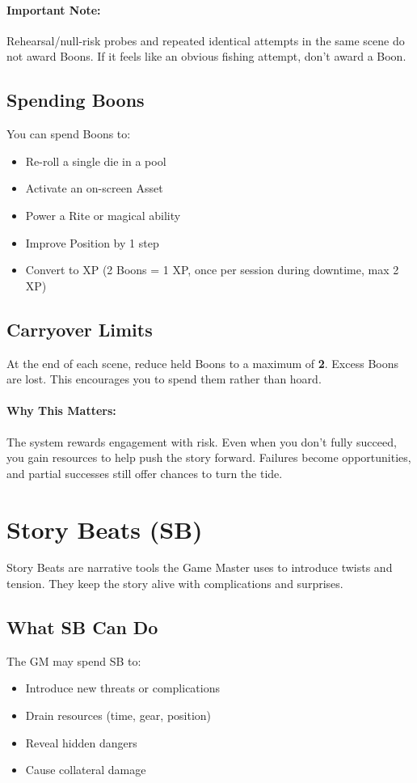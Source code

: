 \paragraph{Important Note:}
Rehearsal/null-risk probes and repeated identical attempts in the same scene do not award Boons. If it feels like an obvious fishing attempt, don't award a Boon.

\subsection*{Spending Boons}
You can spend Boons to:
\begin{itemize}
\item Re-roll a single die in a pool
\item Activate an on-screen Asset
\item Power a Rite or magical ability
\item Improve Position by 1 step
\item Convert to XP (2 Boons = 1 XP, once per session during downtime, max 2 XP)
\end{itemize}

\subsection*{Carryover Limits}
At the end of each scene, reduce held Boons to a maximum of \textbf{2}. Excess Boons are lost. This encourages you to spend them rather than hoard.

\paragraph{Why This Matters:}
The system rewards engagement with risk. Even when you don't fully succeed, you gain resources to help push the story forward. Failures become opportunities, and partial successes still offer chances to turn the tide.

\section{Story Beats (SB)} 

Story Beats are narrative tools the Game Master uses to introduce twists and tension. They keep the story alive with complications and surprises.

\subsection*{What SB Can Do}
The GM may spend SB to:
\begin{itemize}
  \item Introduce new threats or complications
  \item Drain resources (time, gear, position)
  \item Reveal hidden dangers
  \item Cause collateral damage
\end{itemize}

